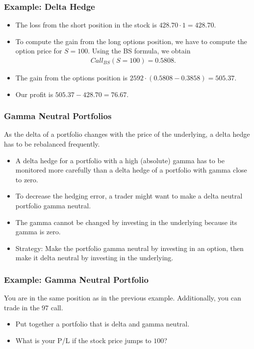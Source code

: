 \begin{frame}[fragile]
\frametitle{Example: Delta Hedge}
\begin{itemize}
  \item The loss from the short position in the stock is $428.70 \cdot
  1=428.70$.
  \item To compute the gain from the long options position, we have to compute
  the option price for $S=100$. Using the BS formula, we obtain
  \begin{align*}
    Call_{BS}(S=100) = 0.5808.
  \end{align*}
  \item The gain from the options position is $2592\cdot(0.5808-0.3858)=505.37$.
  \item Our profit is $505.37-428.70=76.67$.
\end{itemize}
\end{frame}


\begin{frame}[fragile]
\frametitle{Gamma Neutral Portfolios}
As the delta of a portfolio changes with the price of the underlying, a delta
hedge has to be rebalanced frequently.
\begin{itemize}
  \item A delta hedge for a portfolio with a high (absolute) gamma has to be
  monitored more carefully than a delta hedge of a portfolio with gamma close to
  zero.
  \item To decrease the hedging error, a trader might want to make a delta
  neutral portfolio gamma neutral.
  \item The gamma cannot be changed by investing in the underlying because its
  gamma is zero.
  \item Strategy: Make the portfolio gamma neutral by investing in an option,
  then make it delta neutral by investing in the underlying.
\end{itemize}
\end{frame}



\begin{frame}[fragile]
\frametitle{Example: Gamma Neutral Portfolio}
You are in the same position as in the previous example. Additionally, you can
trade in the $97$ call.
\begin{itemize}
  \item Put together a portfolio that is delta and gamma neutral.
  \item What is your P/L if the stock price jumps to $100$?
\end{itemize}
\end{frame}

